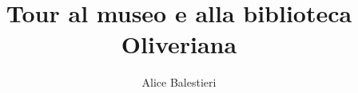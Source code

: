 \documentclass[hidelinks,12pt,a4paper]{article}
\begin{document}
	\begin{flushleft}
		
		\LARGE
		
		\title{\textbf{Tour al museo e alla biblioteca Oliveriana}}
		\author{Alice Balestieri}
		\date{}
		
		\maketitle
		\setcounter{page}{1}
		\newpage
		
		\tableofcontents
		\newpage
		
		
		\vspace*{\fill}
		\doclicenseThis
		
	\end{flushleft}
\end{document}
